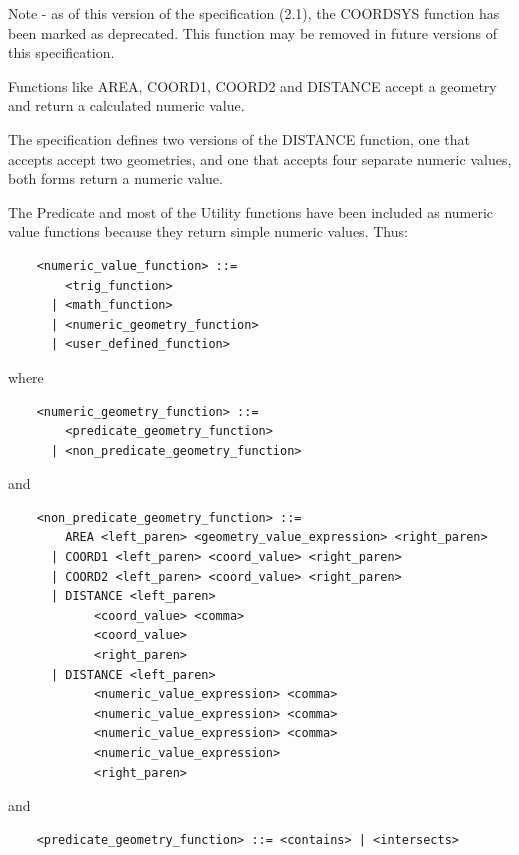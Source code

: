 \documentclass[11pt,a4paper]{ivoa}
\begin{document}
Note - as of this version of the specification (2.1), the COORDSYS function has
been marked as deprecated. This function may be removed in future versions
of this specification.

Functions like AREA, COORD1, COORD2 and DISTANCE accept a geometry and
return a calculated numeric value.

The specification defines two versions of the DISTANCE function,
one that accepts accept two geometries, and one that accepts four
separate numeric values, both forms return a numeric value.

The Predicate and most of the Utility functions have been included as numeric
value functions because they return simple numeric values. Thus:

\begin{verbatim}
    <numeric_value_function> ::=
        <trig_function>
      | <math_function>
      | <numeric_geometry_function>
      | <user_defined_function>
\end{verbatim}

where

\begin{verbatim}
    <numeric_geometry_function> ::=
        <predicate_geometry_function>
      | <non_predicate_geometry_function>
\end{verbatim}

and

\begin{verbatim}
    <non_predicate_geometry_function> ::=
        AREA <left_paren> <geometry_value_expression> <right_paren>
      | COORD1 <left_paren> <coord_value> <right_paren>
      | COORD2 <left_paren> <coord_value> <right_paren>
      | DISTANCE <left_paren>
            <coord_value> <comma>
            <coord_value>
            <right_paren>
      | DISTANCE <left_paren>
            <numeric_value_expression> <comma>
            <numeric_value_expression> <comma>
            <numeric_value_expression> <comma>
            <numeric_value_expression>
            <right_paren>
\end{verbatim}

and

\begin{verbatim}
    <predicate_geometry_function> ::= <contains> | <intersects>
\end{verbatim}

\clearpage
\label{sec:geom.functions.definitions}
\end{document}
